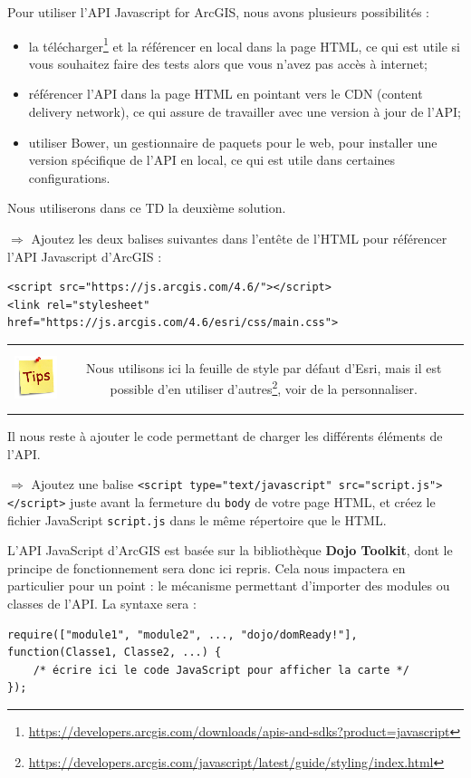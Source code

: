 \documentclass[11pt]{article}
\newcommand{\action}{$\Rightarrow$ }
\newenvironment{note}{%
	\begin{tabular}[t t]{c c}
		\includegraphics{img/tips.png}
		 &
		\begin{minipage}[c]{0.9\linewidth}
			\begin{sffamily}
}{%
			\end{sffamily}
		\end{minipage}
	\end{tabular}
}
\newcommand{\code}[1]{\lstinline{#1}}
\begin{document}
Pour utiliser l'API Javascript for ArcGIS, nous avons plusieurs possibilités :
\begin{itemize}
	\item la télécharger\footnote{\url{https://developers.arcgis.com/downloads/apis-and-sdks?product=javascript}} et la référencer en local dans la page HTML, ce qui est utile si vous souhaitez faire des tests alors que vous n'avez pas accès à internet;
	\item référencer l'API dans la page HTML en pointant vers le CDN (content delivery network), ce qui assure de travailler avec une version à jour de l'API;
	\item utiliser Bower, un gestionnaire de paquets pour le web, pour installer une version spécifique de l'API en local, ce qui est utile dans certaines configurations.
\end{itemize}

Nous utiliserons dans ce TD la deuxième solution.

\action Ajoutez les deux balises suivantes dans l'entête de l'HTML pour référencer l'API Javascript d'ArcGIS :
\begin{lstlisting}
<script src="https://js.arcgis.com/4.6/"></script>
<link rel="stylesheet" href="https://js.arcgis.com/4.6/esri/css/main.css">
\end{lstlisting}

\begin{note}
Nous utilisons ici la feuille de style par défaut d'Esri, mais il est possible d'en utiliser d'autres\footnote{\url{https://developers.arcgis.com/javascript/latest/guide/styling/index.html}}, voir de la personnaliser.
\end{note}

Il nous reste à ajouter le code permettant de charger les différents éléments de l'API.

\action Ajoutez une balise \code{<script type="text/javascript" src="script.js"></script>} juste avant la fermeture du \code{body} de votre page HTML, et créez le fichier JavaScript \code{script.js} dans le même répertoire que le HTML.

L'API JavaScript d'ArcGIS est basée sur la bibliothèque \textbf{Dojo Toolkit}, dont le principe de fonctionnement sera donc ici repris. 
Cela nous impactera en particulier pour un point : le mécanisme permettant d'importer des modules ou classes de l'API.
La syntaxe sera :
\begin{lstlisting}
require(["module1", "module2", ..., "dojo/domReady!"], function(Classe1, Classe2, ...) {
	/* écrire ici le code JavaScript pour afficher la carte */
});
\end{lstlisting}
\end{document}
